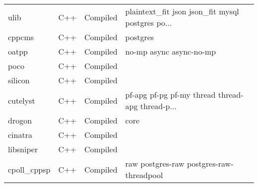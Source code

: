 \begin{longtable}{llll}
    ulib             & C++ & Compiled         & plaintext\_fit json json\_fit mysql postgres po... \\
    cppcms           & C++ & Compiled         & postgres                                           \\
    oatpp            & C++ & Compiled         & no-mp async async-no-mp                            \\
    poco             & C++ & Compiled         &                                                    \\
    silicon          & C++ & Compiled         &                                                    \\
    cutelyst         & C++ & Compiled         & pf-apg pf-pg pf-my thread thread-apg thread-p...   \\
    drogon           & C++ & Compiled         & core                                               \\
    cinatra          & C++ & Compiled         &                                                    \\
    libsniper        & C++ & Compiled         &                                                    \\
    cpoll\_cppsp     & C++ & Compiled         & raw postgres-raw postgres-raw-threadpool           \\
\end{longtable}

